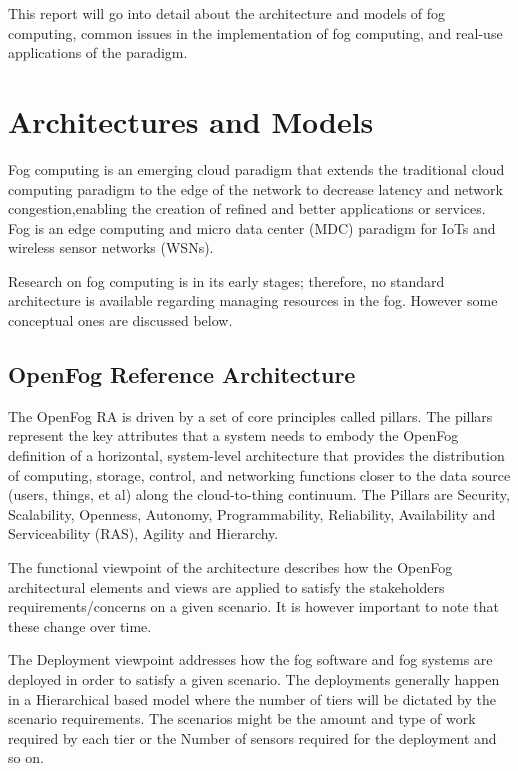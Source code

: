 \documentclass{article}
\begin{document}
This report will go into detail about the architecture and models of fog computing, common issues in the implementation of fog computing, and real-use applications of the paradigm.

\section{Architectures and Models}

Fog computing is an emerging cloud paradigm that extends the traditional cloud computing paradigm to the edge of the network to decrease latency and network congestion,enabling the creation of refined and better applications or services. Fog is an edge computing and micro data center (MDC) paradigm for IoTs and wireless sensor networks (WSNs).

Research on fog computing is in its early stages; therefore, no standard architecture is available regarding managing resources in the fog. However some conceptual ones are discussed below.
\subsection{OpenFog Reference Architecture}

The OpenFog RA is driven by a set of core principles called pillars\cite{openfogconsortium2017}.
The pillars represent the key attributes that a system needs to embody the OpenFog definition of a horizontal, system-level architecture that provides the distribution of computing, storage, control, and networking functions closer to the data source (users, things, et al) along the cloud-to-thing continuum\cite{openfogconsortium2017}.
The Pillars are Security, Scalability, Openness, Autonomy, Programmability, Reliability, Availability and Serviceability (RAS), Agility and Hierarchy.

The functional viewpoint of the architecture describes how the OpenFog architectural elements and views are applied to satisfy the stakeholders requirements/concerns on a given scenario. It is however important to note that these change over time. 

The Deployment viewpoint addresses how the fog software and fog systems are deployed in order to satisfy a given scenario. The deployments generally happen in a Hierarchical based model where the number of tiers will be dictated by the scenario requirements\cite{openfogconsortium2017}.
The scenarios might be the amount and type of work required by each tier or the Number of sensors required for the deployment and so on.
\end{document}
